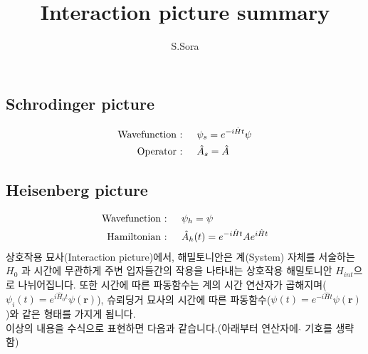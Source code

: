 \documentclass{article}
\begin{document}
\title{Interaction picture summary}
\author{S.Sora}
\maketitle
\subsection*{Schrodinger picture}
\begin{align*}
    \text{Wavefunction : } \quad &\psi_s = e^{-i\Hat{H}t}\psi \\
    \text{Operator : } \quad &\Hat{A}_s = \hat{A}
\end{align*}
\subsection*{Heisenberg picture}
\begin{align*}
    \text{Wavefunction : } \quad &\psi_h = \psi \\ 
    \text{Hamiltonian : } \quad &\hat{A}_h(t) = e^{-i\Hat{H}t}Ae^{i\Hat{H}t}
\end{align*}
상호작용 묘사(Interaction picture)에서, 해밀토니안은 계(System) 자체를 서술하는 $H_0$ 과 시간에 무관하게 주변 입자들간의 작용을 나타내는 상호작용 해밀토니안 $H_{int}$으로 나뉘어집니다. 
또한 시간에 따른 파동함수는 계의 시간 연산자가 곱해지며($\psi_{i}(t) = e^{i\hat{H}_0t}\psi(\textbf{r})$), 
슈뢰딩거 묘사의 시간에 따른 파동함수($\psi(t) = e^{-i\hat{H} t} \psi(\textbf{r})$)와 같은 형태를 가지게 됩니다.\\
이상의 내용을 수식으로 표현하면 다음과 같습니다.(아래부터 연산자에 $\hat{}$ 기호를 생략함)
\end{document}
